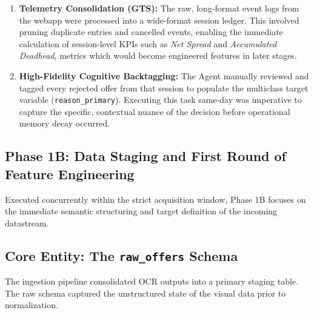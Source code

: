 \begin{enumerate}
    \item \textbf{Telemetry Consolidation (GTS):} The raw, long-format event logs from the webapp were processed into a wide-format session ledger. This involved pruning duplicate entries and cancelled events, enabling the immediate calculation of session-level KPIs such as \textit{Net Spread} and \textit{Accumulated Deadhead}, metrics which would become engineered features in later stages.
    
    \item \textbf{High-Fidelity Cognitive Backtagging:} The Agent manually reviewed and tagged every rejected offer from that session to populate the multiclass target variable (\texttt{reason\_primary}). Executing this task same-day was imperative to capture the specific, contextual nuance of the decision before operational memory decay occurred.
\end{enumerate}


\subsection{Phase 1B: Data Staging and First Round of Feature Engineering}
Executed concurrently within the strict acquisition window, Phase 1B focuses on the immediate semantic structuring and target definition of the incoming datastream. 

\subsection{Core Entity: The \texttt{raw\_offers} Schema}

The ingestion pipeline consolidated OCR outputs into a primary staging table. The raw schema captured the unstructured state of the visual data prior to normalization.

